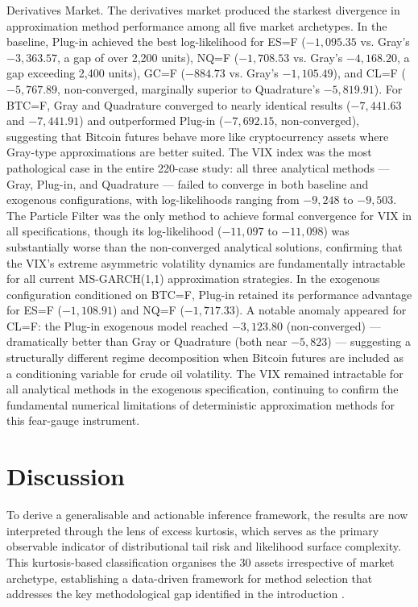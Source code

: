 \documentclass[12pt, a4paper]{article}
\begin{document}
Derivatives Market.
The derivatives market produced the starkest divergence in approximation method performance among all five market archetypes. In the baseline, Plug-in achieved the best log-likelihood for ES=F ($-1{,}095.35$ vs. Gray's $-3{,}363.57$, a gap of over 2{,}200 units), NQ=F ($-1{,}708.53$ vs. Gray's $-4{,}168.20$, a gap exceeding 2{,}400 units), GC=F ($-884.73$ vs. Gray's $-1{,}105.49$), and CL=F ($-5{,}767.89$, non-converged, marginally superior to Quadrature's $-5{,}819.91$). For BTC=F, Gray and Quadrature converged to nearly identical results ($-7{,}441.63$ and $-7{,}441.91$) and outperformed Plug-in ($-7{,}692.15$, non-converged), suggesting that Bitcoin futures behave more like cryptocurrency assets where Gray-type approximations are better suited. The VIX index was the most pathological case in the entire 220-case study: all three analytical methods — Gray, Plug-in, and Quadrature — failed to converge in both baseline and exogenous configurations, with log-likelihoods ranging from $-9{,}248$ to $-9{,}503$. The Particle Filter was the only method to achieve formal convergence for VIX in all specifications, though its log-likelihood ($-11{,}097$ to $-11{,}098$) was substantially worse than the non-converged analytical solutions, confirming that the VIX's extreme asymmetric volatility dynamics are fundamentally intractable for all current MS-GARCH(1,1) approximation strategies. In the exogenous configuration conditioned on BTC=F, Plug-in retained its performance advantage for ES=F ($-1{,}108.91$) and NQ=F ($-1{,}717.33$). A notable anomaly appeared for CL=F: the Plug-in exogenous model reached $-3{,}123.80$ (non-converged) — dramatically better than Gray or Quadrature (both near $-5{,}823$) — suggesting a structurally different regime decomposition when Bitcoin futures are included as a conditioning variable for crude oil volatility. The VIX remained intractable for all analytical methods in the exogenous specification, continuing to confirm the fundamental numerical limitations of deterministic approximation methods for this fear-gauge instrument.

\section{Discussion}
\label{sec:discussion}

To derive a generalisable and actionable inference framework, the results are now interpreted through the lens of excess kurtosis, which serves as the primary observable indicator of distributional tail risk and likelihood surface complexity. This kurtosis-based classification organises the 30 assets irrespective of market archetype, establishing a data-driven framework for method selection that addresses the key methodological gap identified in the introduction \citep{Augustyniak2014, Ardia2018}.
\end{document}
